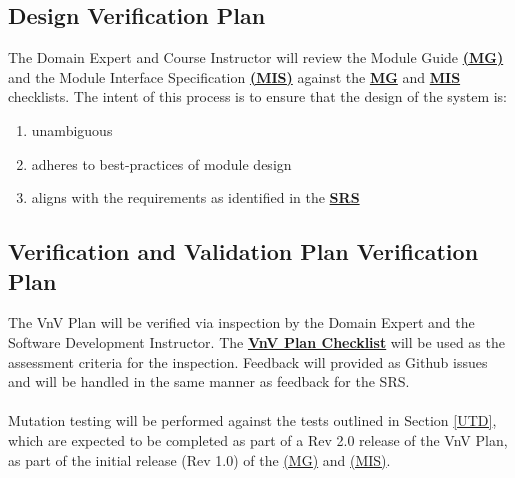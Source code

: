 \documentclass[12pt, titlepage]{article}
\begin{document}
\subsection{Design Verification Plan}
The Domain Expert and Course Instructor will review the Module Guide 
\textbf{\href{https://github.com/KiranSingh15/CAS-741-Image-Correspondences/blob/main/docs/Design/SoftArchitecture/MG.pdf}
{(MG)}} and the Module Interface Specification 
\textbf{\href{https://github.com/KiranSingh15/CAS-741-Image-Correspondences/blob/main/docs/Design/SoftDetailedDes/MIS.pdf}
{(MIS)}} against the 
\textbf{\href{https://github.com/KiranSingh15/CAS-741-Image-Correspondences/blob/main/docs/Checklists/MG-Checklist.pdf}
{MG}} and
\textbf{\href{https://github.com/KiranSingh15/CAS-741-Image-Correspondences/blob/main/docs/Checklists/MIS-Checklist.pdf}
{MIS}} checklists. The intent of this process is to ensure that the design of the system is:
\begin{enumerate}
\item unambiguous
\item adheres to best-practices of module design
\item aligns with the requirements as identified in the 
\textbf{\href{https://github.com/KiranSingh15/CAS-741-Image-Correspondences/blob/main/docs/SRS/SRS.pdf}
{SRS}}
\end{enumerate}


\subsection{Verification and Validation Plan Verification Plan}
The VnV Plan will be verified via inspection by the Domain Expert and the 
Software Development Instructor. The 
\textbf{\href{https://github.com/KiranSingh15/CAS-741-Image-Correspondences/blob/main/docs/Checklists/SRS-Checklist.pdf}
{VnV Plan Checklist}} 
will be used as the assessment criteria for the inspection. 
Feedback will provided as Github issues and will be handled in the same manner as feedback 
for the SRS.\\ \\
Mutation testing will be performed against the tests outlined in Section \ref{UTD}, which are expected to be 
completed as part of a Rev 2.0 release of the VnV Plan, as part of the initial release (Rev 1.0) of the 
{\href{https://github.com/KiranSingh15/CAS-741-Image-Correspondences/blob/main/docs/Design/SoftArchitecture/MG.pdf}
{(MG)}} and 
{\href{https://github.com/KiranSingh15/CAS-741-Image-Correspondences/blob/main/docs/Design/SoftDetailedDes/MIS.pdf}
{(MIS)}}.
\end{document}
